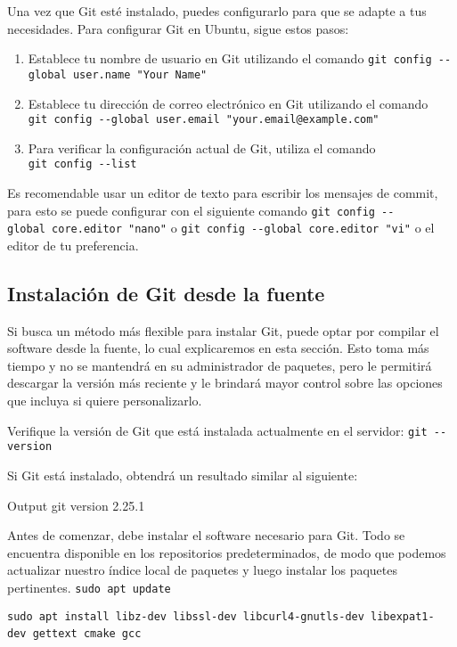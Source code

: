 \documentclass[
  a2paper,
]{article}
\providecommand{\tightlist}{%
  \setlength{\itemsep}{0pt}\setlength{\parskip}{0pt}}\usepackage{longtable,booktabs,array}
\begin{document}
Una vez que Git esté instalado, puedes configurarlo para que se adapte a
tus necesidades. Para configurar Git en Ubuntu, sigue estos pasos:

\begin{enumerate}
\def\labelenumi{\arabic{enumi}.}
\tightlist
\item
  Establece tu nombre de usuario en Git utilizando el comando
  \texttt{git\ config\ -\/-global\ user.name\ "Your\ Name"}
\item
  Establece tu dirección de correo electrónico en Git utilizando el
  comando
  \texttt{git\ config\ -\/-global\ user.email\ "your.email@example.com"}
\item
  Para verificar la configuración actual de Git, utiliza el comando
  \texttt{git\ config\ -\/-list}
\end{enumerate}

Es recomendable usar un editor de texto para escribir los mensajes de
commit, para esto se puede configurar con el siguiente comando
\texttt{git\ config\ -\/-global\ core.editor\ "nano"} o
\texttt{git\ config\ -\/-global\ core.editor\ "vi"} o el editor de tu
preferencia.

\hypertarget{instalaciuxf3n-de-git-desde-la-fuente}{%
\subsection{Instalación de Git desde la
fuente}\label{instalaciuxf3n-de-git-desde-la-fuente}}

Si busca un método más flexible para instalar Git, puede optar por
compilar el software desde la fuente, lo cual explicaremos en esta
sección. Esto toma más tiempo y no se mantendrá en su administrador de
paquetes, pero le permitirá descargar la versión más reciente y le
brindará mayor control sobre las opciones que incluya si quiere
personalizarlo.

Verifique la versión de Git que está instalada actualmente en el
servidor: \texttt{git\ -\/-version}

Si Git está instalado, obtendrá un resultado similar al siguiente:

Output git version 2.25.1

Antes de comenzar, debe instalar el software necesario para Git. Todo se
encuentra disponible en los repositorios predeterminados, de modo que
podemos actualizar nuestro índice local de paquetes y luego instalar los
paquetes pertinentes. \texttt{sudo\ apt\ update}~~

\texttt{sudo\ apt\ install\ libz-dev\ libssl-dev\ libcurl4-gnutls-dev\ libexpat1-dev\ gettext\ cmake\ gcc}~~
\end{document}
